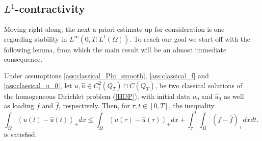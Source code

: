 \documentclass[11pt, a4paper]{article}
\begin{document}
\subsection{$L^1$-contractivity}
Moving right along, the next a priori estimate up for consideration is one regarding stability in $L^\infty(0,T: L^1(\Omega))$. To reach our goal we start off with the following lemma, from which the main result will be an almost immediate consequence.

\begin{lemma}
\label{lem:l1_stability_classical}
Under assumptions \ref{ass:classical_Phi_smooth}, \ref{ass:classical_f} and \ref{ass:classical_u_0}, let $u, \hat{u} \in C^2_1(Q_T)\cap C(\overline{Q}_T)$, be two classical solutions of the homogeneous Dirichlet problem (\ref{HDP}), with initial data $u_0$ and $\hat{u}_0$ as well as loading $f$ and $\hat{f}$, respectively. Then, for $\tau, t \in [0,T]$, the inequality 
\begin{equation}
\label{l1_contr_part1}
\int_{\Omega}(u(t)-\hat{u}(t))_+dx \leq \int_{\Omega}(u(\tau)-\hat{u}(\tau))_+dx + \int_\tau^t\int_{\Omega}(f-\hat{f})_+dxdt.
\end{equation}
is satisfied.
\end{lemma}
\end{document}
